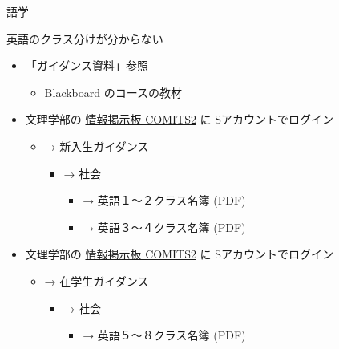 \documentclass[a4j,10pt]{jsarticle}
\def\lthtmlcheckvsize{\ifdim\ht\sizebox<\vsize 
  \ifdim\wd\sizebox<\hsize\expandafter\hfill\fi \expandafter\vfill
  \else\expandafter\vss\fi}%
\begin{document}
{\begin{frame}[label={sec:orgc09f1b5},fragile]{語学}
\par
\begin{block}{英語のクラス分けが分からない}
\begin{itemize}
\item 「ガイダンス資料」参照
\begin{itemize}
\item Blackboard のコースの教材
\end{itemize}
\par
\item 文理学部の \href{https://comits2.educ.chs.nihon-u.ac.jp/uniprove\_pt/UnLoginAction}{情報掲示板 COMITS2} に Sアカウントでログイン
\begin{itemize}
\item → 新入生ガイダンス
\begin{itemize}
\item → 社会
\begin{itemize}
\item → 英語１～２クラス名簿 (PDF)
\item → 英語３～４クラス名簿 (PDF)
\end{itemize}
\end{itemize}
\end{itemize}
\par
\item 文理学部の \href{https://comits2.educ.chs.nihon-u.ac.jp/uniprove\_pt/UnLoginAction}{情報掲示板 COMITS2} に Sアカウントでログイン
\begin{itemize}
\item → 在学生ガイダンス
\begin{itemize}
\item → 社会
\begin{itemize}
\item → 英語５～８クラス名簿 (PDF)
\end{itemize}
\end{itemize}
\end{itemize}
\end{itemize}
\end{block}
\end{frame}%
\lthtmlfigureZ
\lthtmlcheckvsize\clearpage}
\end{document}

